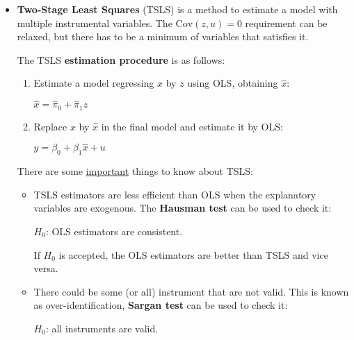 \documentclass[10pt, a4paper, landscape]{article}
\newcommand{\Cov}{\mathrm{Cov}}
\begin{document}
\begin{multicols}{3}
		\begin{itemize}[leftmargin=*]
			\item \textbf{Two-Stage Least Squares} (TSLS) is a method to estimate a model with multiple instrumental variables. The $\Cov(z, u) = 0$ requirement can be relaxed, but there has to be a minimum of variables that satisfies it.
			
			The TSLS \textbf{estimation procedure} is as follows:
			
			\begin{enumerate}[leftmargin=*]
				\item Estimate a model regressing $x$ by $z$ using OLS, obtaining $\hat{x}$:
				
				\begin{center}
					$\hat{x} = \hat{\pi}_{0} + \hat{\pi}_{1} z$
				\end{center}
				
				\item Replace $x$ by $\hat{x}$ in the final model and estimate it by OLS:
				
				\begin{center}
					$y = \beta_{0} + \beta_{1} \hat{x}+ u$
				\end{center}
			\end{enumerate}
			
			There are some \underline{important} things to know about TSLS:
			
			\begin{itemize}[leftmargin=*]
				\item TSLS estimators are less efficient than OLS when the explanatory variables are exogenous. The \textbf{Hausman test} can be used to check it:
				
				\begin{center}
					$H_{0}$: OLS estimators are consistent.
				\end{center}
				
				If $H_{0}$ is accepted, the OLS estimators are better than TSLS and vice versa.
				
				\item There could be some (or all) instrument that are not valid. This is known as over-identification, \textbf{Sargan test} can be used to check it:
				
				\begin{center}
					$H_{0}$: all instruments are valid.
				\end{center}
			\end{itemize}
		\end{itemize}
		

\end{multicols}
\end{document}
